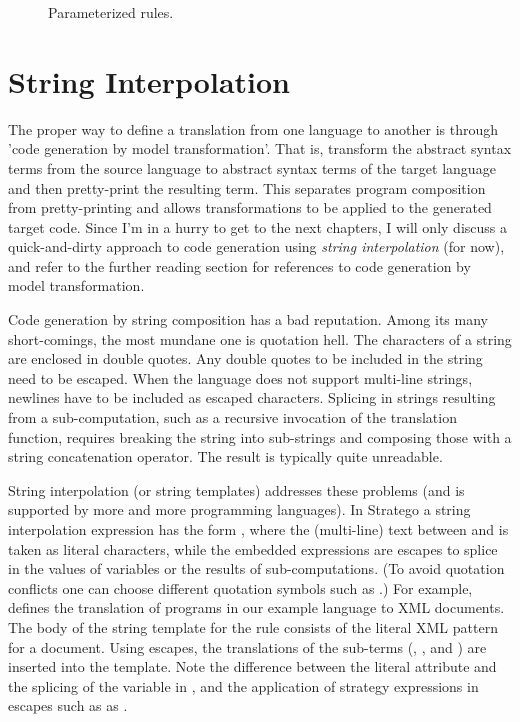 \begin{figure}[t]

\caption{Parameterized rules.}
\end{figure}

\section{String Interpolation}

The proper way to define a translation from one language to another is through
'code generation by model transformation'. That is, transform
the abstract syntax terms from the source language to abstract syntax terms of
the target language and then pretty-print the resulting term. This separates
program composition from pretty-printing and allows transformations to be
applied to the generated target code.
Since I'm in a hurry to get to the next chapters, I will only discuss a
quick-and-dirty approach to code generation using \emph{string interpolation}
(for now), and refer to the further reading section for references to code
generation by model transformation.

Code generation by string composition has a bad reputation. Among its many
short-comings, the most mundane one is quotation hell. The characters of a
string are enclosed in double quotes. Any double quotes to be included in the
string need to be escaped. When the language does not support multi-line
strings, newlines have to be included as escaped characters.
Splicing in strings resulting from a sub-computation, such as a recursive
invocation of the translation function, requires breaking the string into
sub-strings and composing those with a string concatenation operator. The result
is typically quite unreadable.

String interpolation (or string templates) addresses these problems (and is
supported by more and more programming languages). In Stratego a string
interpolation expression has the form \strcode{$[..[..]..]}, where the
(multi-line) text between \strcode{$[} and \strcode{]} is taken as literal
characters, while the embedded \strcode{[..]} expressions are escapes to splice
in the values of variables or the results of sub-computations. (To avoid
quotation conflicts one can choose different quotation symbols such as
.) For example,  defines the translation
of programs in our example language to XML documents. The body of the string
template for the  rule consists of the literal XML pattern for
a  document. Using escapes, the translations of the sub-terms
(, , and ) are inserted into the template.
Note the difference between the literal  attribute and the
splicing of the  variable in , and the
application of strategy expressions in escapes such as as
.

